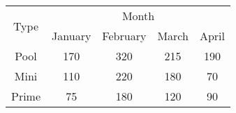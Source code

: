 \begin{tabular}{|c|c|c|c|c|}
\hline
\multirow{2}{*}{Type} & \multicolumn{4}{c|}{Month} \\
\cline{2-5}
& January & February & March & April \\
\hline
Pool & 170 & 320 & 215 & 190 \\
\hline
Mini & 110 & 220 & 180 & 70 \\
\hline
Prime & 75 & 180 & 120 & 90 \\
\hline
\end{tabular}

